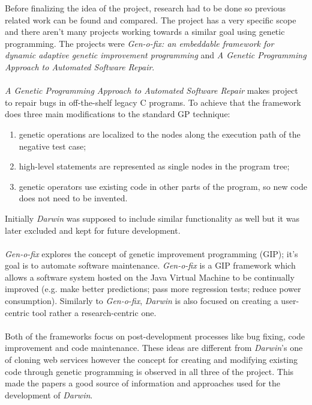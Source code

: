 Before finalizing the idea of the project, research had to be done so previous related work can be found and compared. The project has a very
specific scope and there aren't many projects working towards a similar goal using genetic programming. The projects were
\textit{Gen-o-fix: an embeddable framework for dynamic adaptive genetic improvement programming} and \textit{A Genetic Programming Approach to
Automated Software Repair}\cite{softrepair}.
\paragraph{}
\textit{A Genetic Programming Approach to Automated Software Repair} makes project to repair bugs in off-the-shelf legacy C programs.
To achieve that the framework does three main modifications to the standard GP technique:
\begin{enumerate} 
\item genetic operations are localized to the nodes along the execution path of the negative test case; 
\item high-level statements are represented as single nodes in the program tree;
\item genetic operators use existing code in other parts of the program, so new code does not need to be invented.
\end{enumerate}
 Initially \textit{Darwin} was supposed to include similar functionality as well but it was later excluded and kept for future development.
\paragraph{}
\textit{Gen-o-fix} explores the concept of  genetic improvement programming (GIP); it's goal is to automate software
maintenance. \textit{Gen-o-fix} is a GIP framework which allows a software system hosted on the Java Virtual Machine to be continually improved
(e.g. make better predictions; pass more regression tests; reduce power consumption). Similarly to \textit{Gen-o-fix},
\textit{Darwin} is also focused on creating a user-centric tool rather a research-centric one.
\paragraph{}
Both of the frameworks focus on post-development processes like bug fixing, code improvement and code maintenance. These ideas are different
from \textit{Darwin}'s one of cloning web services however the concept for creating and modifying existing code through genetic programming is observed
in all three of the project. This made the papers a good source of information and approaches used for the development of \textit{Darwin}.